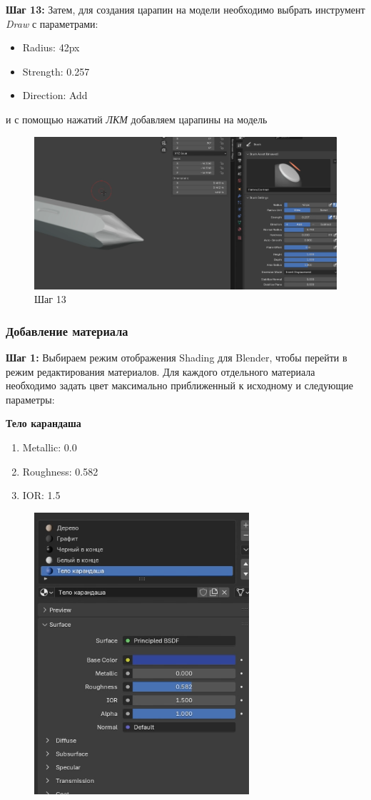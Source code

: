 \documentclass[areasetadvanced]{scrartcl}
\begin{document}
\par \textbf{Шаг 13:} Затем, для создания царапин на модели необходимо выбрать инструмент \textit{Draw} с параметрами:
\begin{itemize}
    \item Radius: 42px
    \item Strength: 0.257
    \item Direction: Add
\end{itemize}
\par и с помощью нажатий \textit{ЛКМ} добавляем царапины на модель
\begin{figure}[H]
    \label{4}  
    \centering
    \includegraphics[width=0.8\linewidth]{pen/13.png}
    \caption{Шаг 13}
\end{figure}


\subsubsection{Добавление материала}
\par \textbf{Шаг 1:} Выбираем режим отображения Shading для Blender, чтобы перейти в режим редактирования материалов. Для каждого отдельного материала необходимо задать цвет максимально приближенный к исходному и следующие параметры:

\par \textbf{Тело карандаша}
\begin{enumerate}
    \item Metallic: 0.0
    \item Roughness: 0.582
    \item IOR: 1.5
\end{enumerate}

\begin{figure}[H]
    \label{4} 
    \centering
    \includegraphics[width=0.4\linewidth]{pen/14.png}
\end{figure}
\end{document}
